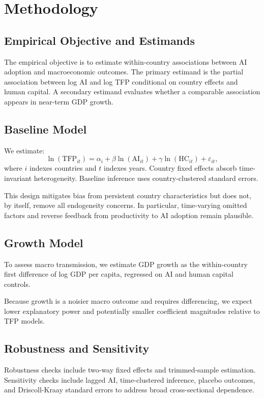 \section{Methodology}

\subsection{Empirical Objective and Estimands}

The empirical objective is to estimate within-country associations between AI adoption and macroeconomic outcomes. The primary estimand is the partial association between log AI and log TFP conditional on country effects and human capital. A secondary estimand evaluates whether a comparable association appears in near-term GDP growth.

\subsection{Baseline Model}

We estimate:
\[
\ln(\mathrm{TFP}_{it}) = \alpha_i + \beta\ln(\mathrm{AI}_{it}) + \gamma\ln(\mathrm{HC}_{it}) + \varepsilon_{it},
\]
where $i$ indexes countries and $t$ indexes years. Country fixed effects absorb time-invariant heterogeneity. Baseline inference uses country-clustered standard errors.

This design mitigates bias from persistent country characteristics but does not, by itself, remove all endogeneity concerns. In particular, time-varying omitted factors and reverse feedback from productivity to AI adoption remain plausible.

\subsection{Growth Model}

To assess macro transmission, we estimate GDP growth as the within-country first difference of log GDP per capita, regressed on AI and human capital controls.

Because growth is a noisier macro outcome and requires differencing, we expect lower explanatory power and potentially smaller coefficient magnitudes relative to TFP models.

\subsection{Robustness and Sensitivity}

Robustness checks include two-way fixed effects and trimmed-sample estimation. Sensitivity checks include lagged AI, time-clustered inference, placebo outcomes, and Driscoll-Kraay standard errors to address broad cross-sectional dependence.

